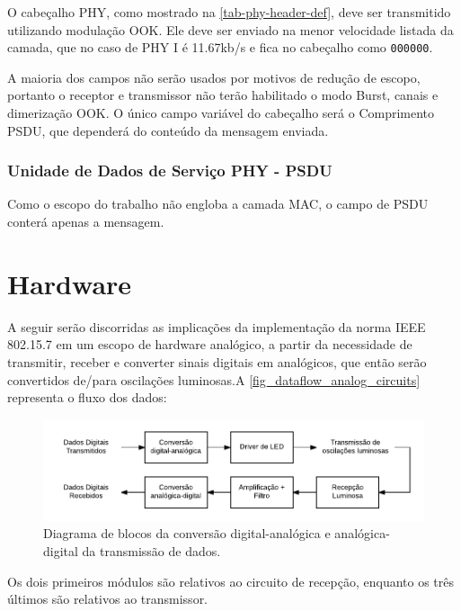 	O cabeçalho PHY, como mostrado na \autoref{tab-phy-header-def}, deve ser transmitido utilizando modulação OOK. Ele deve ser enviado na menor velocidade listada da camada, que no caso de PHY I é 11.67kb/s e fica no cabeçalho como \texttt{000000}.
	
	A maioria dos campos não serão usados por motivos de redução de escopo, portanto o receptor e transmissor não terão habilitado o modo Burst, canais e dimerização OOK.  O único campo variável do cabeçalho será o Comprimento PSDU, que dependerá do conteúdo da mensagem enviada.
	
	\subsubsection{Unidade de Dados de Serviço PHY - PSDU}
	
	Como o escopo do trabalho não engloba a camada MAC, o campo de PSDU conterá apenas a mensagem.
	
	\section{Hardware}\label{sec-hardware}
	
	A seguir serão discorridas as implicações da implementação da norma IEEE 802.15.7 em um escopo de hardware analógico, a partir da necessidade de transmitir, receber e converter sinais digitais em analógicos, que então serão convertidos de/para oscilações luminosas.A \autoref{fig_dataflow_analog_circuits}  representa o fluxo dos dados:
	
	\begin{figure}[htb]
		\caption{\label{fig_dataflow_analog_circuits} Diagrama de blocos da conversão digital-analógica e analógica-digital da transmissão de dados.}
		\centering
		\includegraphics[width=0.6\textheight]{circuits/dataflow_analog_circuits.pdf}
	\end{figure}
	
	Os dois primeiros módulos são relativos ao circuito de recepção, enquanto os três últimos são relativos ao transmissor.
	
